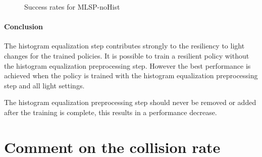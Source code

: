 \begin{figure}
    \centering
    \caption{Success rates for \acs{MLSP-noHist}}
    \label{fig:hardDistance_mixedLight_noHistogramEqualizationTraining_results_withHistogramEqualization}
\end{figure}


\paragraph{Conclusion}
The histogram equalization step contributes strongly to the resiliency to light changes for the trained policies. It is possible to train a resilient policy without the histogram equalization preprocessing step.
However the best performance is achieved when the policy is trained with the histogram equalization preprocessing step and all light settings.

The histogram equalization preprocessing step should never be removed or added after the training is complete, this results in a performance decrease.

\section{Comment on the collision rate}
\label{sec:comment_on_collision_rate}

